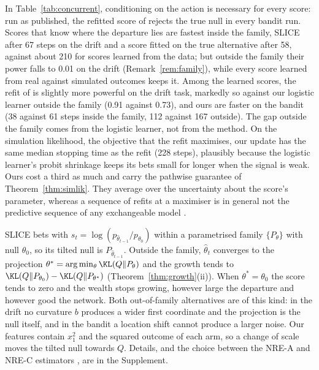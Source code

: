In Table~\ref{tab:concurrent}, conditioning on the action is necessary for
every score: run as published, the refitted score of
\citet{forre2026anytime} rejects the true null in every bandit run. Scores
that know where the departure lies are fastest inside the family, SLICE after
67 steps on the drift and a score fitted on the true alternative after 58,
against about 210 for scores learned from the data; but outside the family
their power falls to 0.01 on the drift (Remark~\ref{rem:family}), while every
score learned from real against simulated outcomes keeps it. Among the learned
scores, the refit of \citet{forre2026anytime} is slightly more powerful on the
drift task, markedly so against our logistic learner outside the family (0.91
against 0.73), and ours are faster on the bandit (38 against 61 steps inside
the family, 112 against 167 outside). The gap outside the family comes from
the logistic learner, not from the method. On the simulation likelihood, the
objective that the refit maximises, our update has the same median stopping
time as the refit (228 steps), plausibly because the logistic learner's probit
shrinkage keeps its bets small for longer when the signal is weak. Ours cost a
third as much and carry the pathwise guarantee of Theorem~\ref{thm:simlik}.
They average over the uncertainty about the score's parameter, whereas a sequence of refits at a maximiser is in general not the
predictive sequence of any exchangeable model
\citep{fortini2000exchangeability,fortini2024exchangeability}.

\begin{remark}\label{rem:family}
SLICE bets with $s_t = \log (p_{\hat\theta_{t-1}}/p_{\theta_0})$ within a
parametrised family $\{P_\theta\}$ with null $\theta_0$, so its tilted null is
$P_{\hat\theta_{t-1}}$. Outside the family, $\hat\theta_t$ converges to the
projection $\theta^* = \arg\min_\theta \KL(Q\|P_\theta)$ and the growth tends to
$\KL(Q\|P_{\theta_0}) - \KL(Q\|P_{\theta^*})$ (Theorem~\ref{thm:growth}(ii)).
When $\theta^* = \theta_0$ the score tends to zero and the wealth stops
growing, however large the departure and however good the network. Both
out-of-family alternatives are of this kind: in the drift no curvature $b$
produces a wider first coordinate and the projection is the null itself, and
in the bandit a location shift cannot produce a larger noise. Our features
contain $x_1^2$ and the squared outcome of each arm, so a change of scale moves
the tilted null towards $Q$. Details, and the choice between the NRE-A and
NRE-C estimators \citep{miller2022contrastive}, are in the Supplement.
\end{remark}

